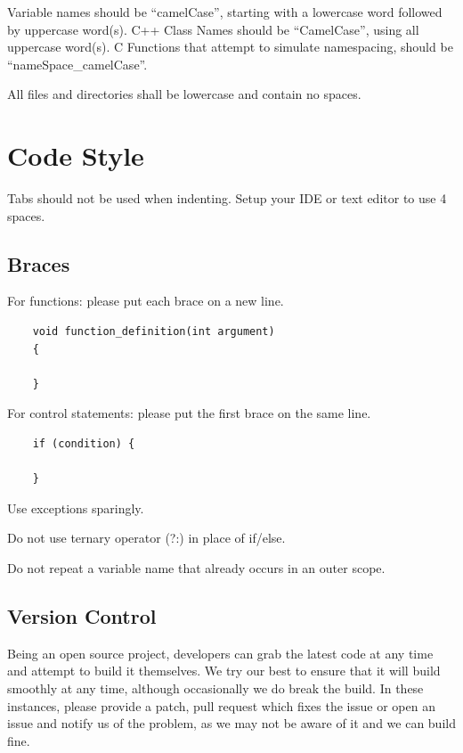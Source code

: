 \documentclass[a4paper, 11pt]{report}
\begin{document}
Variable names should be ``camelCase'', starting with a lowercase word followed by uppercase word(s).
C++ Class Names should be ``CamelCase'', using all uppercase word(s).
C Functions that attempt to simulate namespacing, should be ``nameSpace\_camelCase''.

All files and directories shall be lowercase and contain no spaces.

\section{Code Style}

Tabs should not be used when indenting. Setup your IDE or text editor to use 4 spaces.

\subsection{Braces}

For functions: please put each brace on a new line.

\begin{verbatim}
    void function_definition(int argument)
    {
    
    }
  \end{verbatim}

For control statements: please put the first brace on the same line.

\begin{verbatim}
    if (condition) {
    
    }
\end{verbatim}

Use exceptions sparingly.

Do not use ternary operator (?:) in place of if/else.

Do not repeat a variable name that already occurs in an outer scope.

\subsection{Version Control}

Being an open source project, developers can grab the latest code at any time
and attempt to build it themselves. We try our best to ensure that it will build smoothly
at any time, although occasionally we do break the build. In these instances,
please provide a patch, pull request which fixes the issue or open an issue and
notify us of the problem, as we may not be aware of it and we can build fine.
\end{document}
